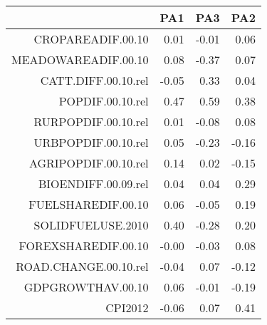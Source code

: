 \begin{table}[ht]
\centering
\begin{tabular}{rrrr}
  \hline
 & PA1 & PA3 & PA2 \\ 
  \hline
CROPAREADIF.00.10 & 0.01 & -0.01 & 0.06 \\ 
  MEADOWAREADIF.00.10 & 0.08 & -0.37 & 0.07 \\ 
  CATT.DIFF.00.10.rel & -0.05 & 0.33 & 0.04 \\ 
  POPDIF.00.10.rel & 0.47 & 0.59 & 0.38 \\ 
  RURPOPDIF.00.10.rel & 0.01 & -0.08 & 0.08 \\ 
  URBPOPDIF.00.10.rel & 0.05 & -0.23 & -0.16 \\ 
  AGRIPOPDIF.00.10.rel & 0.14 & 0.02 & -0.15 \\ 
  BIOENDIFF.00.09.rel & 0.04 & 0.04 & 0.29 \\ 
  FUELSHAREDIF.00.10 & 0.06 & -0.05 & 0.19 \\ 
  SOLIDFUELUSE.2010 & 0.40 & -0.28 & 0.20 \\ 
  FOREXSHAREDIF.00.10 & -0.00 & -0.03 & 0.08 \\ 
  ROAD.CHANGE.00.10.rel & -0.04 & 0.07 & -0.12 \\ 
  GDPGROWTHAV.00.10 & 0.06 & -0.01 & -0.19 \\ 
  CPI2012 & -0.06 & 0.07 & 0.41 \\ 
   \hline
\end{tabular}
\end{table}
